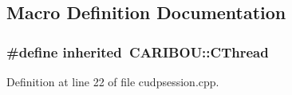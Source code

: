 \subsection{Macro Definition Documentation}
\subsubsection[{inherited}]{\setlength{\rightskip}{0pt plus 5cm}\#define inherited~{\bf C\+A\+R\+I\+B\+O\+U\+::\+C\+Thread}}\label{cudpsession_8cpp_a3920e3b7cb0909b941b2409493acf8f1}


Definition at line 22 of file cudpsession.\+cpp.

